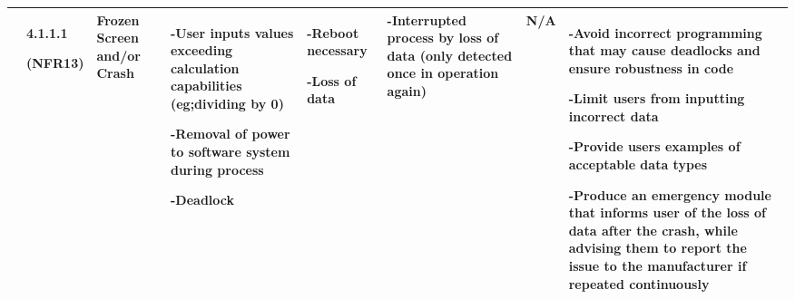 \documentclass[12pt, titlepage]{article}
\begin{document}
\begin{center}
\begin{adjustwidth}{-3.5cm}{}
\begin{tabular}{|p{1.5cm}|p{1.4cm}|p{1.5cm}|p{2cm}|p{3.5cm}|p{2cm}|p{1.4cm}|p{4.3cm}|}
 & 4.1.1.1 \par(NFR13) & Frozen Screen and/or Crash & -User inputs values exceeding calculation capabilities (eg;dividing by 0) \par -Removal of power to software system during process \par -Deadlock & -Reboot necessary \par -Loss of data & -Interrupted process by loss of data (only detected once in operation again) & N/A & -Avoid incorrect programming that may cause deadlocks and ensure robustness in code \par -Limit users from inputting incorrect data \par -Provide users examples of acceptable data types \par -Produce an emergency module that informs user of the loss of data after the crash, while advising them to report the issue to the manufacturer if repeated continuously\\
 \hline
\end{tabular}
\end{adjustwidth}
\end{center}
\end{document}
